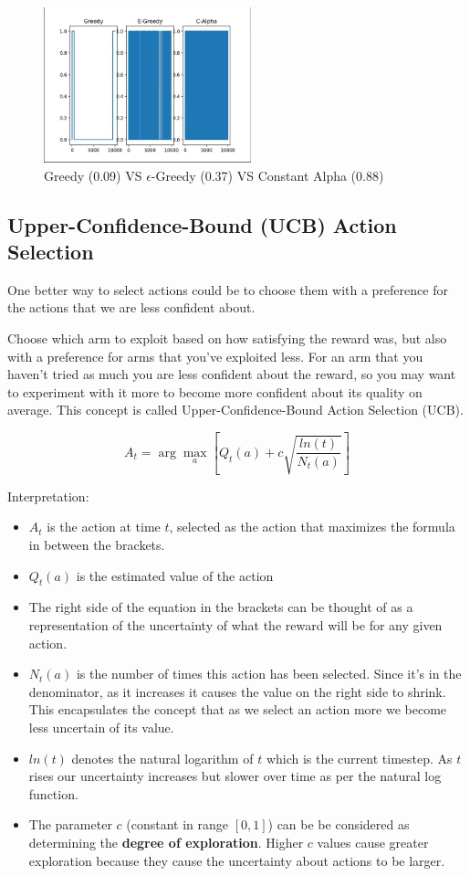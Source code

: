 \begin{figure}[H]
    \centering
    \includegraphics[height=4.5cm]{Pictures/deep-reinforcement-learning/greedy-vs-e-greedy-vs-c-alpha.jpg}
    \caption{Greedy (0.09) VS $\epsilon$-Greedy (0.37) VS Constant Alpha (0.88)}
    \label{fig:enter-label}
\end{figure}

\subsection{Upper-Confidence-Bound (UCB) Action Selection \cite{medium-numsmt2-rl-ch2-part-4}}\label{MAB: Upper-Confidence-Bound (UCB) Action Selection}

One better way to select actions could be to choose them with a preference for the actions that we are less confident about.

Choose which arm to exploit based on how satisfying the reward was, but also with a preference for arms that you’ve exploited less. For an arm that you haven’t tried as much you are less confident about the reward, so you may want to experiment with it more to become more confident about its quality on average. This concept is called Upper-Confidence-Bound Action Selection (UCB).

\[
    A_t = \arg\max_a \left[ Q_t(a) + c \sqrt{\displaystyle\frac{ln(t)}{N_t(a)}} \right]
\]

Interpretation:
\begin{itemize}
    \item $A_t$ is the action at time $t$, selected as the action that maximizes the formula in between the brackets.
    \item $Q_t(a)$ is the estimated value of the action
    \item The right side of the equation in the brackets can be thought of as a representation of the uncertainty of what the reward will be for any given action.
    \item $N_t(a)$ is the number of times this action has been selected. Since it’s in the denominator, as it increases it causes the value on the right side to shrink. This encapsulates the concept that as we select an action more we become less uncertain of its value.
    \item $ln(t)$ denotes the natural logarithm of $t$ which is the current timestep. As $t$ rises our uncertainty increases but slower over time as per the natural log function.
    \item The parameter $c$ (constant in range $[0, 1]$) can be be considered as determining the \textbf{degree of exploration}. Higher $c$ values cause greater exploration because they cause the uncertainty about actions to be larger.
\end{itemize}


